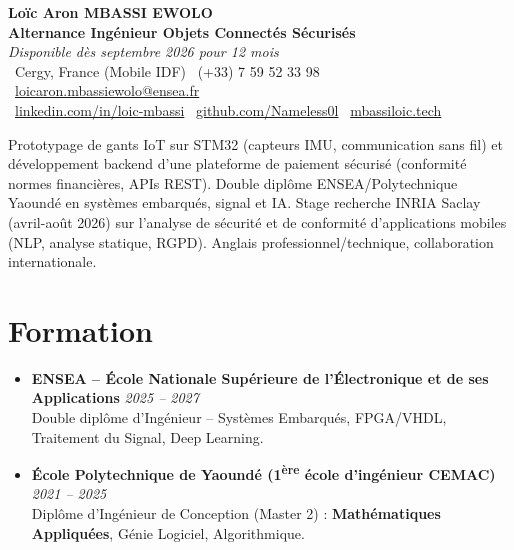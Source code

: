 \documentclass[a4paper,11pt]{article}
\begin{document}
\begin{center}
    {\Large \textbf{Loïc Aron MBASSI EWOLO}} \\ \vspace{4pt}
    \textbf{\large Alternance Ingénieur Objets Connectés Sécurisés} \\
    \textit{\small Disponible dès septembre 2026 pour 12 mois} \\ \vspace{4pt}
    \small
    \faMapMarker\ Cergy, France (Mobile IDF) \quad
    \faPhone\ (+33) 7 59 52 33 98 \quad
    \faEnvelope\ \href{mailto:loicaron.mbassiewolo@ensea.fr}{loicaron.mbassiewolo@ensea.fr} \\ \vspace{2pt}
    \faLinkedin\ \href{https://www.linkedin.com/in/loic-mbassi/}{linkedin.com/in/loic-mbassi} \quad
    \faGithub\ \href{https://github.com/Nameless0l}{github.com/Nameless0l} \quad
    \faGlobe\ \href{https://mbassiloic.tech}{mbassiloic.tech}
\end{center}

\vspace{-6pt}

\noindent\small{Prototypage de gants IoT sur STM32 (capteurs IMU, communication sans fil) et développement backend d'une plateforme de paiement sécurisé (conformité normes financières, APIs REST). Double diplôme ENSEA/Polytechnique Yaoundé en systèmes embarqués, signal et IA. Stage recherche INRIA Saclay (avril-août 2026) sur l'analyse de sécurité et de conformité d'applications mobiles (NLP, analyse statique, RGPD). Anglais professionnel/technique, collaboration internationale.}

\section{Formation}
\begin{itemize}[leftmargin=*, label=\tiny$\bullet$, nosep]
    \item \textbf{ENSEA -- École Nationale Supérieure de l'Électronique et de ses Applications} \hfill \textit{2025 -- 2027} \\
    \small{Double diplôme d'Ingénieur -- Systèmes Embarqués, FPGA/VHDL, Traitement du Signal, Deep Learning.}
    \item \textbf{École Polytechnique de Yaoundé (1\textsuperscript{ère} école d'ingénieur CEMAC)} \hfill \textit{2021 -- 2025} \\
    \small{Diplôme d'Ingénieur de Conception (Master 2) : \textbf{Mathématiques Appliquées}, Génie Logiciel, Algorithmique.}
\end{itemize}
\end{document}

